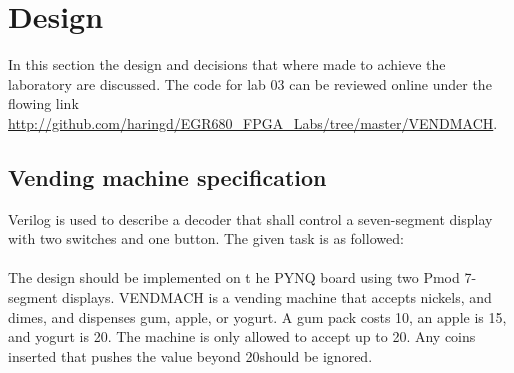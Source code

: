 \section{Design}\label{sec: Design}
In this section the design and decisions that where made to achieve the laboratory are discussed.
The code for lab 03 can be reviewed online under the flowing link \href{https://github.com/haringd/EGR680_FPGA_Labs/tree/master/VENDMACH}{http://github.com/haringd/EGR680\_FPGA\_Labs/tree/master/VENDMACH}.
\subsection{Vending machine specification}\label{subsec: Vending machine specification}
Verilog is used to describe a decoder that shall control a seven-segment display with two switches and one button. The given task is as followed:
\\ \\
The design should be implemented on t he PYNQ board using two Pmod 7-segment displays.
VENDMACH is a vending machine that accepts nickels, and dimes, and dispenses gum, apple, or yogurt. A
gum pack costs 10\cent, an apple is 15\cent, and yogurt is 20\cent. The machine is only allowed to accept up to 20\cent. Any
coins inserted that pushes the value beyond 20\cent should be ignored.

